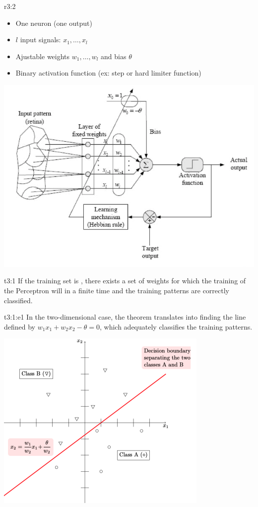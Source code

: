 \documentclass{tron}
\begin{document}
\begin{remark}[Architecture]{r3:2}
	\begin{itemize}
		\item One neuron (one output)
		\item $l$ input signals: $x_1, \dots, x_l$
		\item Ajustable weights $w_1, \dots, w_l$ and bias $\theta$
		\item Binary activation function (ex: step or hard limiter function)
	\end{itemize}
	\includegraphics[width=0.6\columnwidth]{Figs/Lec4/architecture}
\end{remark}

\begin{theorem}{t3:1}
	If the training set is , there exists a set of weights for which the training of the Perceptron will  in a ﬁnite time and the training patterns are correctly classiﬁed.
	
	\begin{example}[2D case]{t3:1:e1}
		In the two-dimensional case, the theorem translates into finding the line defined by $w_1 x_1 + w_2 x_2 - \theta = 0$, which adequately classifies the training patterns.

		\includegraphics[width=0.4\columnwidth]{Figs/Lec4/perceptron_theorem}
	\end{example}
\end{theorem}
\end{document}
